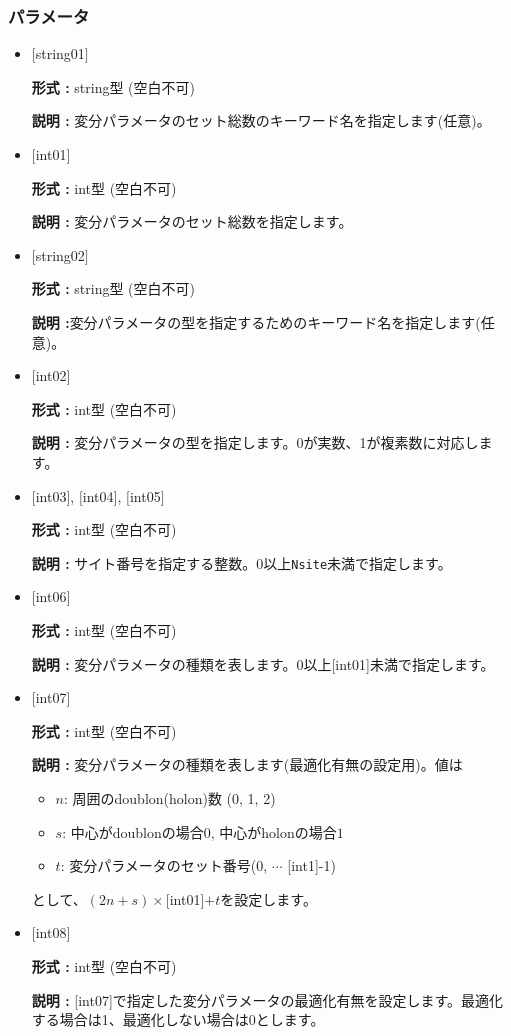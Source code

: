 \subsubsection{パラメータ}
 \begin{itemize}

   \item  $[$string01$]$
   
    {\bf 形式 :} string型 (空白不可)

   {\bf 説明 :} 変分パラメータのセット総数のキーワード名を指定します(任意)。

   \item  $[$int01$]$
   
    {\bf 形式 :} int型 (空白不可)

   {\bf 説明 :} 変分パラメータのセット総数を指定します。

  \item  $[$string02$]$
   
    {\bf 形式 :} string型 (空白不可)

   {\bf 説明 :}変分パラメータの型を指定するためのキーワード名を指定します(任意)。
   
   \item  $[$int02$]$
   
    {\bf 形式 :} int型 (空白不可)

   {\bf 説明 :} 変分パラメータの型を指定します。0が実数、1が複素数に対応します。

  \item  $[$int03$]$,  $[$int04$]$, $[$int05$]$
   
 {\bf 形式 :} int型 (空白不可)

{\bf 説明 :} サイト番号を指定する整数。0以上\verb|Nsite|{未満}で指定します。
 
 \item  $[$int06$]$
   
   {\bf 形式 :} int型 (空白不可)

  {\bf 説明 :} 変分パラメータの種類を表します。0以上[int01]{未満}で指定します。

 \item  $[$int07$]$
   
   {\bf 形式 :} int型 (空白不可)

  {\bf 説明 :} 変分パラメータの種類を表します(最適化有無の設定用)。値は
  \begin{itemize}
  \item{$n$}: 周囲のdoublon(holon)数 (0, 1, 2)  \\
  \item{$s$}: 中心がdoublonの場合$0$, 中心がholonの場合$1$ \\
  \item{$t$}: 変分パラメータのセット番号(0, $\cdots$ [int1]-1)
  \end{itemize}  
  として、$(2n+s)\times$[int01]$+t$を設定します。
  
 \item  $[$int08$]$
   
   {\bf 形式 :} int型 (空白不可)

  {\bf 説明 :} [int07]で指定した変分パラメータの最適化有無を設定します。最適化する場合は1、最適化しない場合は0とします。
  
  
\end{itemize}

